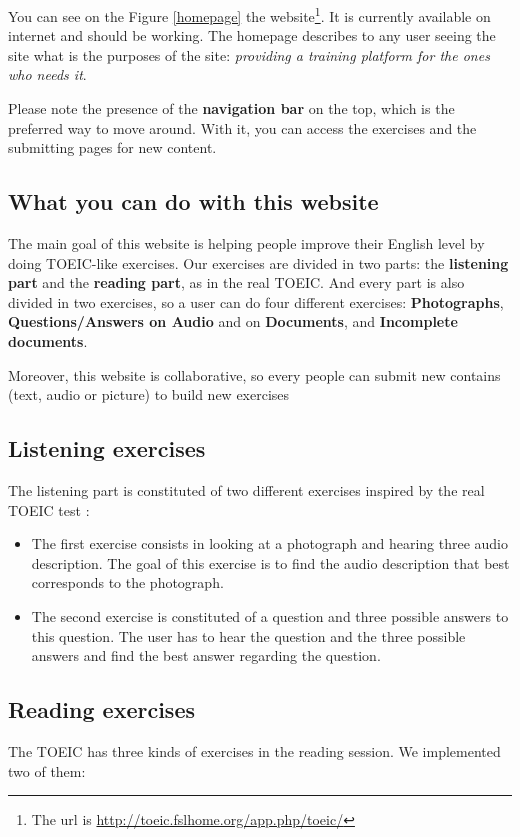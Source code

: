 \documentclass[12pt,a4paper]{report}
\begin{document}
You can see on the Figure \ref{homepage} the website\footnote{The url is
\url{http://toeic.fslhome.org/app.php/toeic/}}. It is currently available on
internet and should be working. The homepage describes to any user seeing the site what is the purposes of the site: \textit{providing a training platform for the ones who needs it}.

Please note the presence of the \textbf{navigation bar} on the top, which is the preferred way to move around. With it, you can access the exercises and the submitting pages for new content.


\subsection{What you can do with this website}

The main goal of this website is helping people improve their
English level by doing TOEIC-like exercises. Our exercises are
divided in two parts: the \textbf{listening part} and the
\textbf{reading part}, as in the real TOEIC. And every part
is also divided in two exercises, so a user can do four different
exercises: \textbf{Photographs}, \textbf{Questions/Answers on Audio} and
on \textbf{Documents}, and \textbf{Incomplete documents}.

Moreover, this website is collaborative, so every people can submit new contains (text, audio or picture) to build new exercises

\subsection{Listening exercises}

The listening part is constituted of two different exercises inspired by the real TOEIC test :

\begin{itemize}
\item The first exercise consists in looking at a photograph and hearing three audio description. The goal of this exercise is to find the audio description that best corresponds to the photograph.

\item The second exercise is constituted of a question and three possible answers to this question. The user has to hear the question and the three possible answers and find the best answer regarding the question.
\end{itemize}

\subsection{Reading exercises}
The TOEIC has three kinds of exercises in the reading session. We implemented
two of them:
\end{document}
